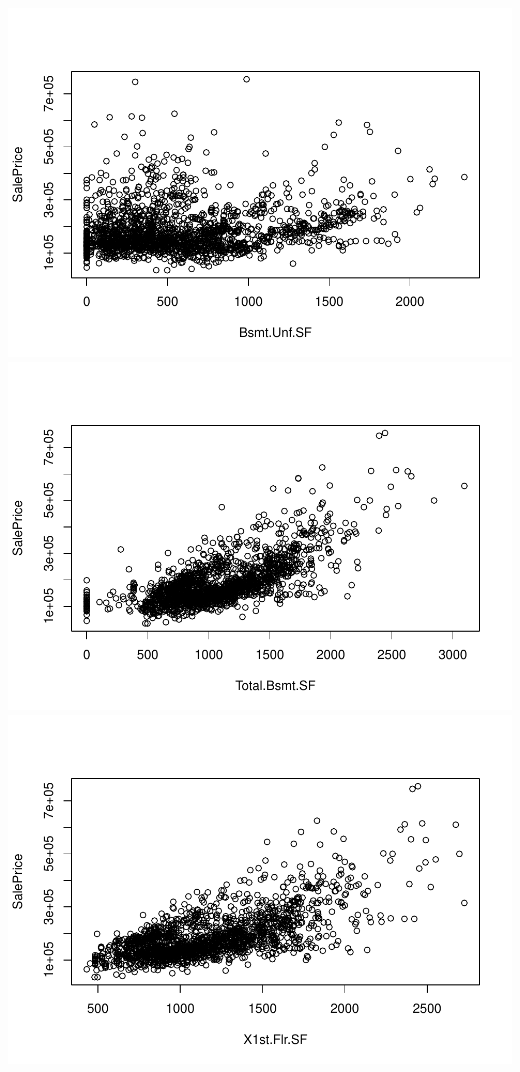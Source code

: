 \documentclass[
]{article}
\begin{document}
\includegraphics{Predicting-Housing-Price_files/figure-latex/unnamed-chunk-2-10.pdf}
\includegraphics{Predicting-Housing-Price_files/figure-latex/unnamed-chunk-2-11.pdf}
\includegraphics{Predicting-Housing-Price_files/figure-latex/unnamed-chunk-2-12.pdf}
\end{document}
